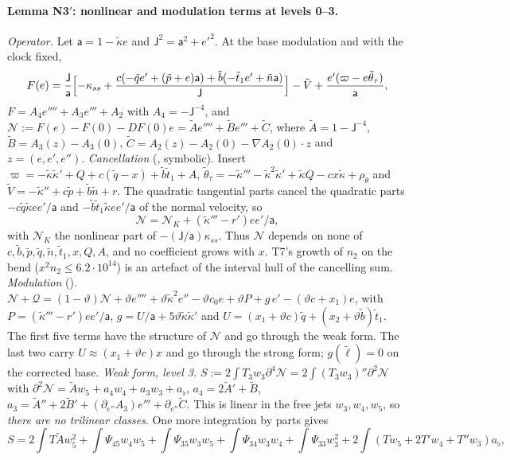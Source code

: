 \documentclass[11pt]{article}
\theoremstyle{definition}
\theoremstyle{remark}
\newcommand{\fn}[1]{\texttt{\detokenize{#1}}}
\newcommand{\kt}{\tilde\kappa}
\newcommand{\lt}{\tilde\ell}
\newcommand{\cN}{\mathcal N}
\newcommand{\cQ}{\mathcal Q}
\begin{document}
\paragraph{Lemma N3$'$: nonlinear and modulation terms at levels 0--3.} \emph{Operator.} Let $\mathsf a=1-\kt e$ and $\mathsf J^2=\mathsf a^2+e'^2$. At the base modulation and with the clock fixed,
\[
F(e)=\frac{\mathsf J}{\mathsf a}\Bigl[-\kappa_{ss}+\frac{c(-\tilde qe'+(\tilde p+e)\mathsf a)+\tilde b(-\tilde t_1e'+\tilde n\mathsf a)}{\mathsf J}\Bigr]-\tilde V+\frac{e'(\varpi-e\tilde\theta_\tau)}{\mathsf a},
\]
$F=A_4e''''+A_3e'''+A_2$ with $A_4=-\mathsf J^{-4}$, and $\cN:=F(e)-F(0)-DF(0)e=\tilde Ae''''+\tilde Be'''+\tilde C$, where $\tilde A=1-\mathsf J^{-4}$, $\tilde B=A_3(z)-A_3(0)$, $\tilde C=A_2(z)-A_2(0)-\nabla A_2(0)\cdot z$ and $z=(e,e',e'')$. \emph{Cancellation} (\fn{n3sym.py}, symbolic). Insert $\varpi=-\kt\kt'+Q+c(\tilde q-x)+\tilde b\tilde t_1+A$, $\tilde\theta_\tau=-\kt'''-\kt^2\kt'+\kt Q-cx\kt+\rho_\theta$ and $\tilde V=-\kt''+c\tilde p+\tilde b\tilde n+r$. The quadratic tangential parts cancel the quadratic parts $-c\tilde q\kt ee'/\mathsf a$ and $-\tilde b\tilde t_1\kt ee'/\mathsf a$ of the normal velocity, so
\[
\cN=\cN_K+(\kt'''-r')ee'/\mathsf a,
\]
with $\cN_K$ the nonlinear part of $-(\mathsf J/\mathsf a)\kappa_{ss}$. Thus $\cN$ depends on none of $c,\tilde b,\tilde p,\tilde q,\tilde n,\tilde t_1,x,Q,A$, and no coefficient grows with $x$. T7's growth of $n_2$ on the bend ($x^2n_2\le6.2\cdot10^{14}$) is an artefact of the interval hull of the cancelling sum. \emph{Modulation} (\fn{n3qsym.py}). $\cN+\cQ=(1-\vartheta)\cN+\vartheta e''''+\vartheta\kt^2e''-\vartheta c_0e+\vartheta P+g\,e'-(\vartheta c+x_1)e$, with $P=(\kt'''-r')ee'/\mathsf a$, $g=U/\mathsf a+5\vartheta\kt\kt'$ and $U=(x_1+\vartheta c)\tilde q+(x_2+\vartheta\tilde b)\tilde t_1$. The first five terms have the structure of $\cN$ and go through the weak form. The last two carry $U\approx(x_1+\vartheta c)x$ and go through the strong form; $g(\lt)=0$ on the corrected base. \emph{Weak form, level 3.} $S:=2\int T_3w_3\partial^4\cN=2\int(T_3w_3)''\partial^2\cN$ with $\partial^2\cN=\tilde Aw_5+a_4w_4+a_3w_3+a_\flat$, $a_4=2\tilde A'+\tilde B$, $a_3=\tilde A''+2\tilde B'+(\partial_{e''}A_3)e'''+\partial_{e''}\tilde C$. This is linear in the free jets $w_3,w_4,w_5$, so \emph{there are no trilinear classes}. One more integration by parts gives
\[
S=2\!\int\!T\tilde Aw_5^2+\!\int\!\Psi_{45}w_4w_5+\!\int\!\Psi_{35}w_3w_5+\!\int\!\Psi_{34}w_3w_4+\!\int\!\Psi_{33}w_3^2+2\!\int\!(Tw_5+2T'w_4+T''w_3)a_\flat,
\]
\end{document}
